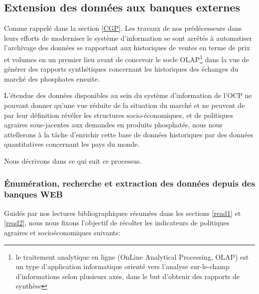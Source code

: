 	\subsection{Extension des données aux banques externes}
	Comme rappelé dans la section \ref{CGP}. Les travaux de nos prédécesseurs dans leurs efforts de moderniser le système d'information se sont arrêtés à automatiser l'archivage des données se rapportant aux historiques de ventes en terme de prix et volumes en un premier lieu\cite{CHEMLAL} avant de concevoir le socle OLAP\footnote{le traitement analytique en ligne (OnLine Analytical Processing, OLAP) est un type d'application informatique orienté vers l'analyse sur-le-champ d'informations selon plusieurs axes, dans le but d'obtenir des rapports de synthèse} dans la vue de générer des rapports synthétiques concernant les historiques des échanges du marché des phosphates ensuite\cite{NACER}.
	\par
	L'étendue des données disponibles au sein du système d'information de l'OCP ne pouvant donner qu'une vue réduite de la situation du marché et ne peuvent de par leur définition révéler les structures socio-économiques,  et de politiques agraires sous-jacentes aux demandes en produits phosphatés, nous nous attellerons à la tâche d'enrichir cette base de données historiques par des données quantitatives concernant les pays du monde.
	\par
	Nous décrivons dans ce qui suit ce processus. 
	\subsubsection{Énumération, recherche et extraction des données depuis des banques WEB}
		Guidés par nos lectures bibliographiques résumées dans les sections \ref{read1} et \ref{read2}, nous nous fixons l'objectif de récolter les indicateurs de politiques agraires et socioéconomiques suivants:
